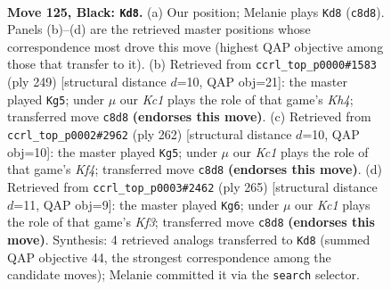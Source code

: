 \documentclass[11pt]{article}
\begin{document}
\clearpage

\begin{figure}[p]\centering
\begin{subfigure}{0.46\textwidth}\centering
\resizebox{\linewidth}{!}{%
\newchessgame
\chessboard[
  setfen={2k5/4r3/4p2R/4P3/5P2/8/4K3/8 b - - 1 125},
  showmover=false,
  pgfstyle=straightmove, color=movearrow, markmove={c8-d8}
]}
\caption{}
\end{subfigure}\hfill
\begin{subfigure}{0.46\textwidth}\centering
\resizebox{\linewidth}{!}{%
\newchessgame
\chessboard[
  setfen={8/8/4r3/7k/3R2p1/6P1/3K1P2/8 b - - 52 125},
  showmover=false,
  pgfstyle=straightmove, color=movearrow, markmove={h5-g5}
]}
\caption{}
\end{subfigure}
\\[4pt]
\begin{subfigure}{0.46\textwidth}\centering
\resizebox{\linewidth}{!}{%
\newchessgame
\chessboard[
  setfen={8/P4p1k/1R6/4P2p/5K2/8/8/r7 w - - 1 132},
  showmover=false,
  pgfstyle=straightmove, color=movearrow, markmove={f4-g5}
]}
\caption{}
\end{subfigure}\hfill
\begin{subfigure}{0.46\textwidth}\centering
\resizebox{\linewidth}{!}{%
\newchessgame
\chessboard[
  setfen={8/8/5k2/R6p/5P2/6P1/6K1/1r6 b - - 7 133},
  showmover=false,
  pgfstyle=straightmove, color=movearrow, markmove={f6-g6}
]}
\caption{}
\end{subfigure}
\caption{\textbf{Move 125, Black: \texttt{Kd8}.} (a) Our position; Melanie plays \texttt{Kd8} (\texttt{c8d8}). Panels (b)--(d) are the retrieved master positions whose correspondence most drove this move (highest QAP objective among those that transfer to it). (b) Retrieved from \texttt{ccrl\_top\_p0000\#1583} (ply 249) [structural distance $d$=10, QAP obj=21]: the master played \texttt{Kg5}; under $\mu$ our \emph{Kc1} plays the role of that game's \emph{Kh4}; transferred move \texttt{c8d8} \textbf{(endorses this move)}. (c) Retrieved from \texttt{ccrl\_top\_p0002\#2962} (ply 262) [structural distance $d$=10, QAP obj=10]: the master played \texttt{Kg5}; under $\mu$ our \emph{Kc1} plays the role of that game's \emph{Kf4}; transferred move \texttt{c8d8} \textbf{(endorses this move)}. (d) Retrieved from \texttt{ccrl\_top\_p0003\#2462} (ply 265) [structural distance $d$=11, QAP obj=9]: the master played \texttt{Kg6}; under $\mu$ our \emph{Kc1} plays the role of that game's \emph{Kf3}; transferred move \texttt{c8d8} \textbf{(endorses this move)}. Synthesis: 4 retrieved analogs transferred to \texttt{Kd8} (summed QAP objective 44, the strongest correspondence among the candidate moves); Melanie committed it via the \texttt{search} selector.}
\label{fig:thought-m249}
\end{figure}
\end{document}

